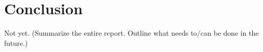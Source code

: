 \section{Conclusion}
Not yet. (Summarize the entire report. Outline what needs to/can be done in the future.)

